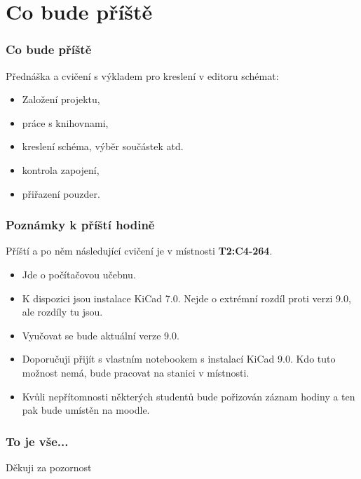 \documentclass{beamer}
\begin{document}
\section{\texorpdfstring{Co bude příště}{Co bude priste}}
	\begin{frame}
    \frametitle{Co bude příště}
	
		Přednáška a cvičení s výkladem pro kreslení v editoru schémat:
		\begin{itemize}
			\item Založení projektu,
			\item práce s knihovnami,
			\item kreslení schéma, výběr součástek atd.
			\item kontrola zapojení,
			\item přiřazení pouzder.
		\end{itemize}
	\end{frame}
	\begin{frame}
    \frametitle{Poznámky k příští hodině}
		
		Příští a po něm následující cvičení je v místnosti \textbf{T2:C4-264}.
		\begin{itemize}
			\item Jde o počítačovou učebnu.
			\item K dispozici jsou instalace KiCad 7.0. Nejde o extrémní rozdíl proti verzi 9.0, ale rozdíly tu jsou.
			\item Vyučovat se bude aktuální verze 9.0.
			\item Doporučuji přijít s vlastním notebookem s instalací KiCad 9.0. Kdo tuto možnost nemá, bude pracovat na stanici v místnosti.
			\item Kvůli nepřítomnosti některých studentů bude pořizován záznam hodiny a ten pak bude umístěn na moodle.
		\end{itemize}
	\end{frame}
	\begin{frame}
    \frametitle{To je vše...}
		
		\begin{center}
			\Large{Děkuji za pozornost}
		\end{center}
	\end{frame}
\end{document}
